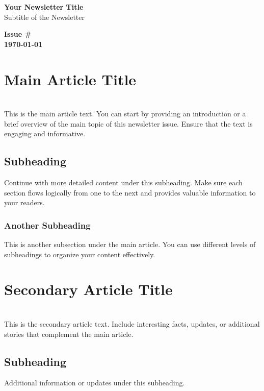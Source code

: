 \documentclass{article}
\begin{document}
\begin{center}
    {\LARGE \textbf{Your Newsletter Title}} \\
    {\large Subtitle of the Newsletter}
\end{center}

\vspace{1cm}

\begin{flushright}
    \textbf{Issue \#} \\
    \textbf{\today}
\end{flushright}

\vspace{1cm}

\section*{Main Article Title}
\\
This is the main article text. You can start by providing an introduction or a brief overview of the main topic of this newsletter issue. Ensure that the text is engaging and informative.

\subsection*{Subheading}
Continue with more detailed content under this subheading. Make sure each section flows logically from one to the next and provides valuable information to your readers.

\subsubsection*{Another Subheading}
This is another subsection under the main article. You can use different levels of subheadings to organize your content effectively.

\section*{Secondary Article Title}
\\
This is the secondary article text. Include interesting facts, updates, or additional stories that complement the main article.

\subsection*{Subheading}
Additional information or updates under this subheading.
\end{document}
